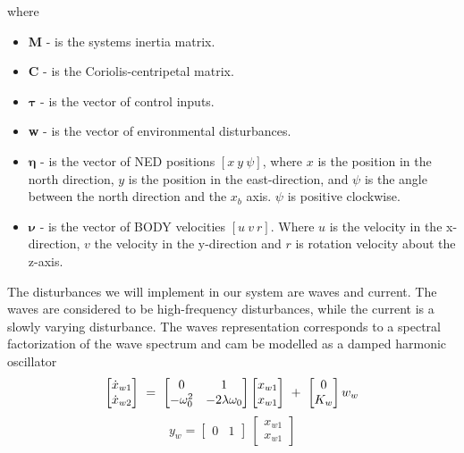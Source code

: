 where
\begin{itemize}
    \item \textbf{M} - is the systems inertia matrix.
    \item \textbf{C} - is the Coriolis-centripetal matrix.
    \item $\boldsymbol{\tau}$ - is the vector of control inputs.
    \item \textbf{w} - is the vector of environmental disturbances.
    \item $\boldsymbol{\eta}$ - is the vector of NED positions $[x \ y \ \psi]$, where $x$ is the position in the north direction, $y$ is the position in the east-direction, and $\psi$  is the angle between the north direction and the $x_b$ axis. $\psi$ is positive clockwise.
    \item $\boldsymbol{\nu}$ - is the vector of BODY velocities $[u \ v \ r]$. Where $u$ is the velocity in the x-direction, $v$ the velocity in the y-direction and $r$ is rotation velocity about the z-axis.
\end{itemize}
The disturbances we will implement in our system are waves and current.  The waves are considered to be high-frequency disturbances, while the current is a slowly varying disturbance. The waves representation corresponds to a spectral factorization of the wave spectrum and cam be modelled as a damped harmonic oscillator
\begin{equation*}
    \begin{bmatrix}
        \dot{x}_{w1}\\
        \dot{x}_{w2}
    \end{bmatrix} \ = \ \begin{bmatrix}
        0 & 1 \\ 
        -\omega_0^2 & -2\lambda \omega_0
    \end{bmatrix} \begin{bmatrix}
        x_{w1} \\
        x_{w1}
    \end{bmatrix} \ + \ \begin{bmatrix}
        0 \\ K_w
    \end{bmatrix} w_w \\
\end{equation*}
\begin{equation*}
    y_w = \begin{bmatrix}
        0 & 1
    \end{bmatrix} \ \begin{bmatrix}
        x_{w1} \\
        x_{w1}
    \end{bmatrix}
\end{equation*}
